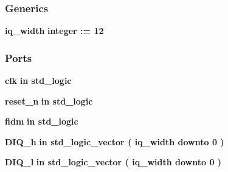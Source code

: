 \subsubsection*{Generics}
 \begin{DoxyCompactItemize}
\item 
{\bf iq\+\_\+width} {\bfseries {\bfseries \textcolor{comment}{integer}\textcolor{vhdlchar}{ }\textcolor{vhdlchar}{ }\textcolor{vhdlchar}{\+:}\textcolor{vhdlchar}{=}\textcolor{vhdlchar}{ }\textcolor{vhdlchar}{ } \textcolor{vhdldigit}{12} \textcolor{vhdlchar}{ }}}
\end{DoxyCompactItemize}
\subsubsection*{Ports}
 \begin{DoxyCompactItemize}
\item 
{\bf clk}  {\bfseries {\bfseries \textcolor{keywordflow}{in}\textcolor{vhdlchar}{ }}} {\bfseries \textcolor{comment}{std\+\_\+logic}\textcolor{vhdlchar}{ }} 
\item 
{\bf reset\+\_\+n}  {\bfseries {\bfseries \textcolor{keywordflow}{in}\textcolor{vhdlchar}{ }}} {\bfseries \textcolor{comment}{std\+\_\+logic}\textcolor{vhdlchar}{ }} 
\item 
{\bf fidm}  {\bfseries {\bfseries \textcolor{keywordflow}{in}\textcolor{vhdlchar}{ }}} {\bfseries \textcolor{comment}{std\+\_\+logic}\textcolor{vhdlchar}{ }} 
\item 
{\bf D\+I\+Q\+\_\+h}  {\bfseries {\bfseries \textcolor{keywordflow}{in}\textcolor{vhdlchar}{ }}} {\bfseries \textcolor{comment}{std\+\_\+logic\+\_\+vector}\textcolor{vhdlchar}{ }\textcolor{vhdlchar}{(}\textcolor{vhdlchar}{ }\textcolor{vhdlchar}{ }\textcolor{vhdlchar}{ }\textcolor{vhdlchar}{ }{\bfseries {\bf iq\+\_\+width}} \textcolor{vhdlchar}{ }\textcolor{keywordflow}{downto}\textcolor{vhdlchar}{ }\textcolor{vhdlchar}{ } \textcolor{vhdldigit}{0} \textcolor{vhdlchar}{ }\textcolor{vhdlchar}{)}\textcolor{vhdlchar}{ }} 
\item 
{\bf D\+I\+Q\+\_\+l}  {\bfseries {\bfseries \textcolor{keywordflow}{in}\textcolor{vhdlchar}{ }}} {\bfseries \textcolor{comment}{std\+\_\+logic\+\_\+vector}\textcolor{vhdlchar}{ }\textcolor{vhdlchar}{(}\textcolor{vhdlchar}{ }\textcolor{vhdlchar}{ }\textcolor{vhdlchar}{ }\textcolor{vhdlchar}{ }{\bfseries {\bf iq\+\_\+width}} \textcolor{vhdlchar}{ }\textcolor{keywordflow}{downto}\textcolor{vhdlchar}{ }\textcolor{vhdlchar}{ } \textcolor{vhdldigit}{0} \textcolor{vhdlchar}{ }\textcolor{vhdlchar}{)}\textcolor{vhdlchar}{ }} 

\end{DoxyCompactItemize}
